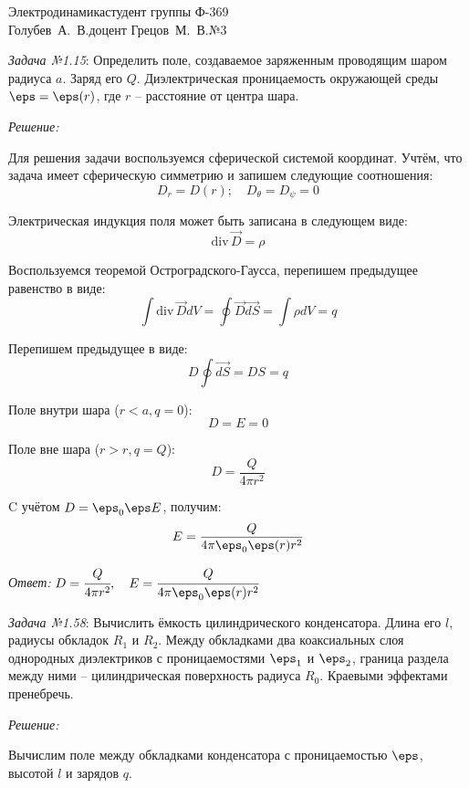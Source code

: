 




{Электродинамика}{студент группы Ф-369\\Голубев~А.~В.}{доцент Грецов~М.~В.}{№3}

\newcommand{\grad}{\mathrm{grad}\,}
\renewcommand{\div}{\mathrm{div}\,}

\newpage

\emph{Задача №1.15}: Определить поле, создаваемое заряженным проводящим шаром 
радиуса \( a \). Заряд его \( Q \). Диэлектрическая проницаемость окружающей 
среды \( \eps = \eps(r) \), где \( r \) -- расстояние от центра шара.

\emph{Решение:} 

Для решения задачи воспользуемся сферической системой координат. Учтём, что 
задача имеет сферическую симметрию и запишем следующие соотношения:
\[
	D_r = D(r);\quad
	D_\theta = D_\psi = 0
\]

Электрическая индукция поля может быть записана в следующем виде:
\[
	\div{\vec{D}} = \rho
\]

Воспользуемся теоремой Остроградского-Гаусса, перепишем предыдущее равенство 
в виде:
\[
	\int \div\vec{D} dV = \oint \vec{D}\vec{dS} = \int \rho dV = q
\]

Перепишем предыдущее в виде:
\[
	D \oint\vec{dS} = DS = q
\]

Поле внутри шара (\( r < a, q = 0 \)):
\[
	D = E = 0
\]

Поле вне шара (\( r > r, q = Q \)):
\[
	D = \frac{Q}{4\pi r^2}
\]

C учётом \( D = \eps_0\eps E \), получим:
\[
	E = \frac{Q}{4\pi\eps_0\eps(r) r^2}
\]

\emph{Ответ:} \( D = \cfrac{Q}{4\pi r^2},\quad E = \cfrac{Q}{4\pi\eps_0\eps(r) r^2}\)
 
\newpage

\emph{Задача №1.58}: Вычислить ёмкость цилиндрического конденсатора. Длина 
его \( l \), радиусы обкладок \( R_1 \) и \( R_2 \). Между обкладками два 
коаксиальных слоя однородных диэлектриков с проницаемостями \( \eps_1 \) 
и \( \eps_2 \), граница раздела между ними -- цилиндрическая поверхность 
радиуса \( R_0 \). Краевыми эффектами пренебречь.

\emph{Решение:}

Вычислим поле между обкладками конденсатора с проницаемостью \( \eps \), 
высотой \( l \) и зарядов \( q \). 

